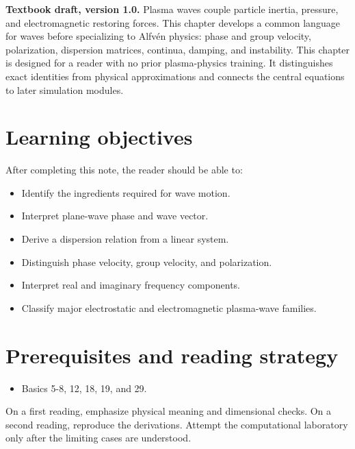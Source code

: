 \documentclass[11pt]{article}
\begin{document}

\begin{overviewbox}
\textbf{Textbook draft, version 1.0.} Plasma waves couple particle inertia, pressure, and electromagnetic restoring forces. This chapter develops a common language for waves before specializing to Alfvén physics: phase and group velocity, polarization, dispersion matrices, continua, damping, and instability. This chapter is designed for a reader with no prior plasma-physics training. It distinguishes exact identities from physical approximations and connects the central equations to later simulation modules.
\end{overviewbox}

\ProjectTOC

\section{Learning objectives}
After completing this note, the reader should be able to:
\begin{itemize}[leftmargin=1.6em]
\item Identify the ingredients required for wave motion.
\item Interpret plane-wave phase and wave vector.
\item Derive a dispersion relation from a linear system.
\item Distinguish phase velocity, group velocity, and polarization.
\item Interpret real and imaginary frequency components.
\item Classify major electrostatic and electromagnetic plasma-wave families.
\end{itemize}

\section{Prerequisites and reading strategy}
\begin{itemize}[leftmargin=1.6em]
\item Basics 5-8, 12, 18, 19, and 29.
\end{itemize}
On a first reading, emphasize physical meaning and dimensional checks. On a second reading, reproduce the derivations. Attempt the computational laboratory only after the limiting cases are understood.
\end{document}
